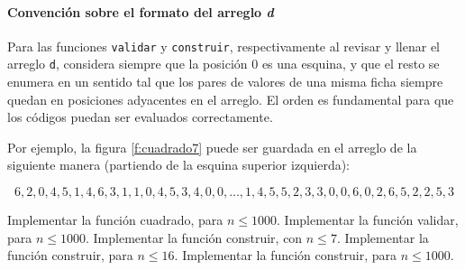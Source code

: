 \documentclass{oci}
\begin{document}
\paragraph{Convención sobre el formato del arreglo \emph{d}}
Para las funciones \verb+validar+ y \verb+construir+, respectivamente al revisar y llenar el arreglo \verb+d+, considera siempre que la posición 0 es una esquina, y que el resto se enumera en un sentido tal que los pares de valores de una misma ficha siempre quedan en posiciones adyacentes en el arreglo. El orden es fundamental para que los códigos puedan ser evaluados correctamente.

Por ejemplo, la figura \ref{f:cuadrado7} puede ser guardada en el arreglo de la siguiente manera (partiendo de la esquina superior izquierda):

$$ 6, 2, 0, 4, 5, 1, 4, 6, 3, 1, 1, 0, 4, 5, 3, 4, 0, 0, \dots, 1, 4, 5, 5, 2, 3, 3, 0, 0, 6, 0, 2, 6, 5, 2, 2, 5, 3 $$

\begin{scoreDescription}
   Implementar la función cuadrado, para $n \le 1000$.
   Implementar la función validar, para $n \le 1000$.
   Implementar la función construir, con $n \le 7$.
   Implementar la función construir, para $n \le 16$.
   Implementar la función construir, para $n \le 1000$.
\end{scoreDescription}
\end{document}
